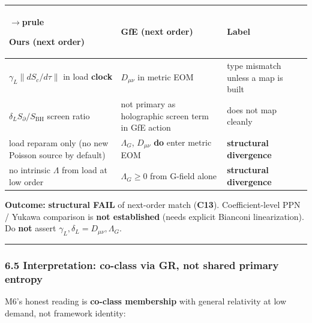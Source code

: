 \documentclass[
  11pt,
]{article}
\newcounter{none} %
\begin{document}
{\def\LTcaptype{none} %
\begin{longtable}[]{@{}
  >{\raggedright\arraybackslash}p{}
  >{\raggedright\arraybackslash}p{}
  >{\raggedright\arraybackslash}p{}@{}}
$\rightarrow$prule\noalign{}
\begin{minipage}[b]{\linewidth}\raggedright
Ours (next order)
\end{minipage} & \begin{minipage}[b]{\linewidth}\raggedright
GfE (next order)
\end{minipage} & \begin{minipage}[b]{\linewidth}\raggedright
Label
\end{minipage} \\
\midrule\noalign{}
\endhead
\bottomrule\noalign{}
\endlastfoot
\(\gamma_L\|dS_c/d\tau\|\) in load \textbf{clock} & \(D_{\mu\nu}\) in metric EOM & type mismatch unless a map is built \\
\(\delta_L S_{\partial}/S_{\mathrm{BH}}\) screen ratio & not primary as holographic screen term in GfE action & does not map cleanly \\
load reparam only (no new Poisson source by default) & \(\Lambda_G\), \(D_{\mu\nu}\) \textbf{do} enter metric EOM & \textbf{structural divergence} \\
no intrinsic \(\Lambda\) from load at low order & \(\Lambda_G\ge 0\) from G-field alone & \textbf{structural divergence} \\
\end{longtable}
}

\textbf{Outcome:} \textbf{structural FAIL} of next-order match (\textbf{C13}). Coefficient-level PPN / Yukawa comparison is \textbf{not established} (needs explicit Bianconi linearization). Do \textbf{not} assert \(\gamma_L,\delta_L=D_{\mu\nu},\Lambda_G\).

\begin{center}\rule{0.5\linewidth}{0.5pt}\end{center}

\subsubsection{6.5 Interpretation: co-class via GR, not shared primary entropy}\label{interpretation-co-class-via-gr-not-shared-primary-entropy}

M6's honest reading is \textbf{co-class membership} with general relativity at low demand, not framework identity:
\end{document}
